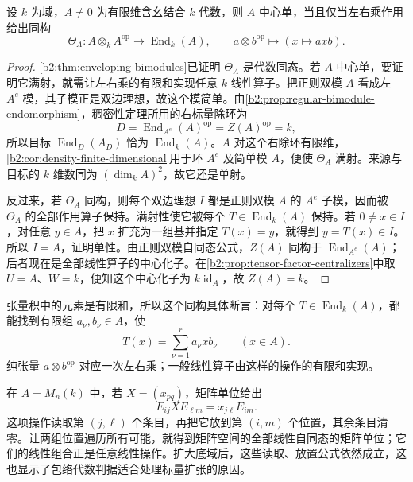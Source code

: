 \begin{theorem}[包络代数判据]\label{b2:thm:csa-enveloping-isomorphism}
	设 \(k\) 为域，\(A\ne0\) 为有限维含幺结合 \(k\) 代数，则 \(A\) 中心单，当且仅当左右乘作用给出同构
	\begin{equation}\label{b2:eq:csa-enveloping-isomorphism}
		\Theta_A:A\otimes_kA^{\mathrm{op}}\longrightarrow\operatorname{End}_k(A), \qquad a\otimes b^{\mathrm{op}}\longmapsto(x\mapsto axb).
	\end{equation}
\end{theorem}
\begin{proof}
	\cref{b2:thm:enveloping-bimodules}已证明 \(\Theta_A\) 是代数同态。若 \(A\) 中心单，要证明它满射，就需让左右乘的有限和实现任意 \(k\) 线性算子。把正则双模 \(A\) 看成左 \(A^e\) 模，其子模正是双边理想，故这个模简单。由\cref{b2:prop:regular-bimodule-endomorphism}，稠密性定理所用的右标量除环为
	\[
		D=\operatorname{End}_{A^e}(A)^{\mathrm{op}}=Z(A)^{\mathrm{op}}=k,
	\]
	所以目标 \(\operatorname{End}_D(A_D)\) 恰为 \(\operatorname{End}_k(A)\)。\(A\) 对这个右除环有限维，\cref{b2:cor:density-finite-dimensional}用于环 \(A^e\) 及简单模 \(A\)，便使 \(\Theta_A\) 满射。来源与目标的 \(k\) 维数同为 \((\dim_kA)^2\)，故它还是单射。

	反过来，若 \(\Theta_A\) 同构，则每个双边理想 \(I\) 都是正则双模 \(A\) 的 \(A^e\) 子模，因而被 \(\Theta_A\) 的全部作用算子保持。满射性使它被每个 \(T\in\operatorname{End}_k(A)\) 保持。若 \(0\ne x\in I\)，对任意 \(y\in A\)，把 \(x\) 扩充为一组基并指定 \(T(x)=y\)，就得到 \(y=T(x)\in I\)。所以 \(I=A\)，证明单性。由正则双模自同态公式，\(Z(A)\) 同构于 \(\operatorname{End}_{A^e}(A)\)；后者现在是全部线性算子的中心化子。在\cref{b2:prop:tensor-factor-centralizers}中取 \(U=A\)、\(W=k\)，便知这个中心化子为 \(k\operatorname{id}_A\)，故 \(Z(A)=k\)。
\end{proof}

张量积中的元素是有限和，所以这个同构具体断言：对每个 \(T\in\operatorname{End}_k(A)\)，都能找到有限组 \(a_\nu,b_\nu\in A\)，使
\[
	T(x)=\sum_{\nu=1}^{r}a_\nu x b_\nu\qquad(x\in A).
\]
纯张量 \(a\otimes b^{\mathrm{op}}\) 对应一次左右乘；一般线性算子由这样的操作的有限和实现。

\ProseParagraphBreak
在 \(A=M_n(k)\) 中，若 \(X=(x_{pq})\)，矩阵单位给出
\[
	E_{ij}XE_{\ell m}=x_{j\ell}E_{im}.
\]
这项操作读取第 \((j,\ell)\) 个条目，再把它放到第 \((i,m)\) 个位置，其余条目清零。让两组位置遍历所有可能，就得到矩阵空间的全部线性自同态的矩阵单位；它们的线性组合正是任意线性操作。扩大底域后，这些读取、放置公式依然成立，这也显示了包络代数判据适合处理标量扩张的原因。

